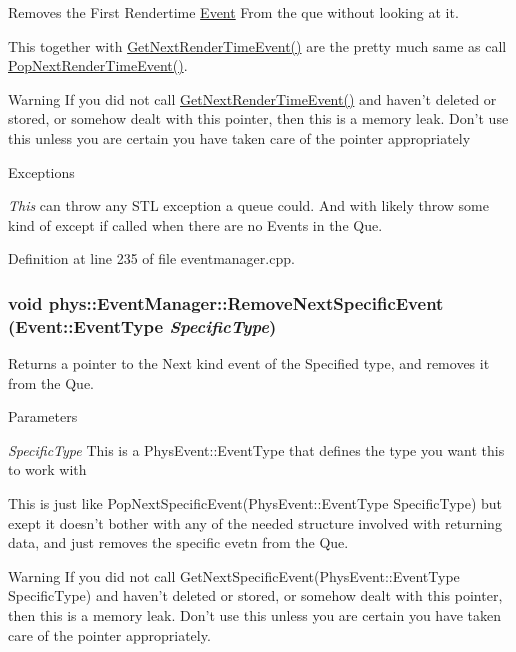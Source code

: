 Removes the First Rendertime \hyperlink{classphys_1_1Event}{Event} From the que without looking at it. 

This together with \hyperlink{classphys_1_1EventManager_ae8730b039a280449af052d75f2e60b06}{GetNextRenderTimeEvent()} are the pretty much same as call \hyperlink{classphys_1_1EventManager_aa7e800d34ad8b9295ac87dfa822a2a03}{PopNextRenderTimeEvent()}. \begin{DoxyWarning}{Warning}
If you did not call \hyperlink{classphys_1_1EventManager_ae8730b039a280449af052d75f2e60b06}{GetNextRenderTimeEvent()} and haven't deleted or stored, or somehow dealt with this pointer, then this is a memory leak. Don't use this unless you are certain you have taken care of the pointer appropriately 
\end{DoxyWarning}

\begin{DoxyExceptions}{Exceptions}
\item[{\em This}]can throw any STL exception a queue could. And with likely throw some kind of except if called when there are no Events in the Que. \end{DoxyExceptions}


Definition at line 235 of file eventmanager.cpp.

\hypertarget{classphys_1_1EventManager_aa15f81b71bde3e14048ec1fefa9d3591}{
\subsubsection[{RemoveNextSpecificEvent}]{\setlength{\rightskip}{0pt plus 5cm}void phys::EventManager::RemoveNextSpecificEvent ({\bf Event::EventType} {\em SpecificType})}}
\label{da/dde/classphys_1_1EventManager_aa15f81b71bde3e14048ec1fefa9d3591}


Returns a pointer to the Next kind event of the Specified type, and removes it from the Que. 


\begin{DoxyParams}{Parameters}
\item[{\em SpecificType}]This is a PhysEvent::EventType that defines the type you want this to work with\end{DoxyParams}
This is just like PopNextSpecificEvent(PhysEvent::EventType SpecificType) but exept it doesn't bother with any of the needed structure involved with returning data, and just removes the specific evetn from the Que. \begin{DoxyWarning}{Warning}
If you did not call GetNextSpecificEvent(PhysEvent::EventType SpecificType) and haven't deleted or stored, or somehow dealt with this pointer, then this is a memory leak. Don't use this unless you are certain you have taken care of the pointer appropriately. 
\end{DoxyWarning}


